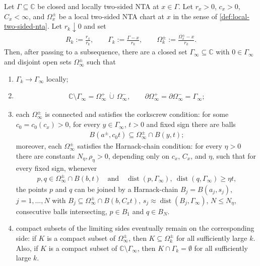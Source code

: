 \documentclass[11pt,a4paper,english,reqno]{amsart}
\numberwithin{equation}{section}
\newcommand{\CC}[0]{\mathbb{C}}
\renewcommand{\subset}{\subseteq}
\DeclareMathOperator{\dist}{dist}
\numberwithin{definition}{section}
\begin{document}
\begin{lemma}\label{thm:local-nta-blowup-limit}
    Let $\Gamma\subset\CC$ be closed and locally two-sided NTA at $x\in\Gamma$.  Let $r_x>0$, $c_x>0$, $C_x<\infty$, and $\Omega_x^\pm$ be a local two-sided NTA chart at $x$ in the sense of \cref{def:local-two-sided-nta}.  Let $r_k\downarrow0$ and set
    \begin{align}
        R_k:=\frac{r_x}{r_k},\qquad
        \Gamma_k:=\frac{\Gamma-x}{r_k},\qquad
        \Omega_k^\pm:=\frac{\Omega_x^\pm-x}{r_k} .
    \end{align}
    Then, after passing to a subsequence, there are a closed set $\Gamma_\infty\subset\CC$ with $0\in\Gamma_\infty$ and disjoint open sets $\Omega_\infty^\pm$ such that
    \begin{enumerate}
        \item $\Gamma_k\to\Gamma_\infty$ locally;
        \item
              \begin{align}
                  \CC\setminus\Gamma_\infty=\Omega_\infty^+\,\dot\cup\,\Omega_\infty^-,
                  \qquad
                  \partial\Omega_\infty^+=\partial\Omega_\infty^-=\Gamma_\infty;
              \end{align}
        \item each $\Omega_\infty^\pm$ is connected and satisfies the corkscrew condition: for some $c_0=c_0(c_x)>0$, for every $y\in\Gamma_\infty$, $t>0$ and fixed sign there are balls
              \begin{align}
                  B(a^\pm,c_0t)\subset \Omega_\infty^\pm\cap B(y,t);
              \end{align}
              moreover, each $\Omega_\infty^\pm$ satisfies the Harnack-chain condition: for every $\eta>0$ there are constants $N_\eta,\rho_\eta>0$, depending only on $c_x$, $C_x$, and $\eta$, such that for every fixed sign, whenever       
               \begin{align}
                  p,q\in\Omega_\infty^\pm\cap B(b,t)
                  \quad\text{and}\quad
                  \dist(p,\Gamma_\infty),\ \dist(q,\Gamma_\infty)\ge \eta t,
              \end{align}
              the points $p$ and $q$ can be joined by a Harnack-chain $B_j = B(a_j,s_j)$, $j=1,...,N$ with
              \(B_j \subset \Omega_∞^\pm \cap B(b,C_x t)\), $s_j \approx \dist(B_j, Γ_∞)$, \(N\le N_\eta\), consecutive balls intersecting, $p\in B_1$ and $q\in B_N$.
        \item compact subsets of the limiting sides eventually remain on the corresponding side: if $K$ is a compact subset of $\Omega_\infty^\pm$, then $K\subset\Omega_k^\pm$ for all sufficiently large $k$.  Also, if $K$ is a compact subset of $\CC\setminus\Gamma_\infty$, then $K\cap\Gamma_k=\emptyset$ for all sufficiently large $k$.
    \end{enumerate}
\end{lemma}
\end{document}
